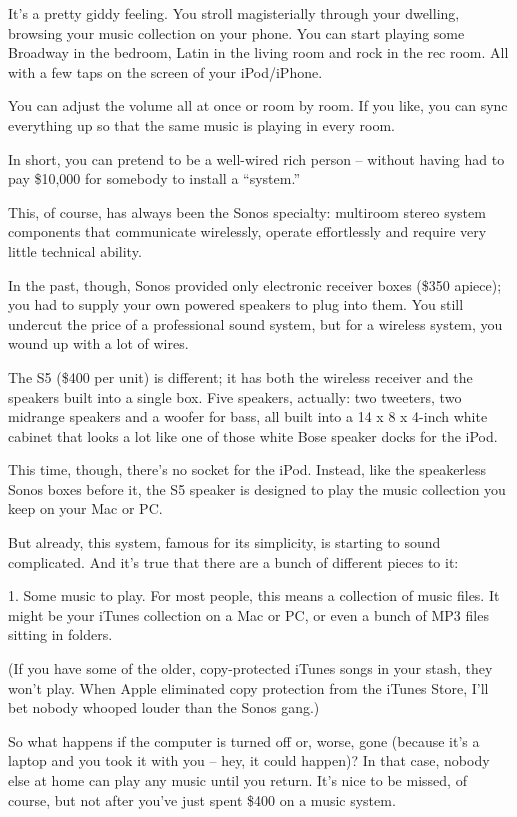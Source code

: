 ﻿\documentclass[12pt]{article}
\begin{document}
It's a pretty giddy feeling. You stroll magisterially through your dwelling, browsing your music
collection on your phone. You can start playing some Broadway in the bedroom, Latin in the living
room and rock in the rec room. All with a few taps on the screen of your iPod/iPhone.

You can adjust the volume all at once or room by room. If you like, you can sync everything up so
that the same music is playing in every room.

In short, you can pretend to be a well-wired rich person -- without having had to pay \$10,000 for
somebody to install a ``system.''

This, of course, has always been the Sonos specialty: multiroom stereo system components that
communicate wirelessly, operate effortlessly and require very little technical ability.

In the past, though, Sonos provided only electronic receiver boxes (\$350 apiece); you had to supply
your own powered speakers to plug into them. You still undercut the price of a professional sound
system, but for a wireless system, you wound up with a lot of wires.

The S5 (\$400 per unit) is different; it has both the wireless receiver and the speakers built into
a single box. Five speakers, actually: two tweeters, two midrange speakers and a woofer for bass,
all built into a 14 x 8 x 4-inch white cabinet that looks a lot like one of those white Bose speaker
docks for the iPod.

This time, though, there's no socket for the iPod. Instead, like the speakerless Sonos boxes before
it, the S5 speaker is designed to play the music collection you keep on your Mac or PC.

But already, this system, famous for its simplicity, is starting to sound complicated. And it's true
that there are a bunch of different pieces to it:

1. Some music to play. For most people, this means a collection of music files. It might be your
iTunes collection on a Mac or PC, or even a bunch of MP3 files sitting in folders.

(If you have some of the older, copy-protected iTunes songs in your stash, they won't play. When
Apple eliminated copy protection from the iTunes Store, I'll bet nobody whooped louder than the
Sonos gang.)

So what happens if the computer is turned off or, worse, gone (because it's a laptop and you took it
with you -- hey, it could happen)? In that case, nobody else at home can play any music until you
return. It's nice to be missed, of course, but not after you've just spent \$400 on a music system.
\end{document}
